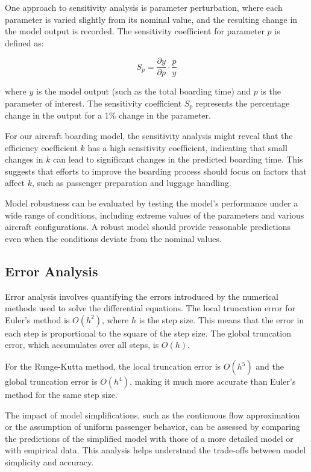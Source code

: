 One approach to sensitivity analysis is parameter perturbation, where each parameter is varied slightly from its nominal value, and the resulting change in the model output is recorded. The sensitivity coefficient for parameter $p$ is defined as:

\begin{equation}
S_p = \frac{\partial y}{\partial p} \cdot \frac{p}{y}
\label{eq:sensitivity}
\end{equation}

where $y$ is the model output (such as the total boarding time) and $p$ is the parameter of interest. The sensitivity coefficient $S_p$ represents the percentage change in the output for a 1\% change in the parameter.

For our aircraft boarding model, the sensitivity analysis might reveal that the efficiency coefficient $k$ has a high sensitivity coefficient, indicating that small changes in $k$ can lead to significant changes in the predicted boarding time. This suggests that efforts to improve the boarding process should focus on factors that affect $k$, such as passenger preparation and luggage handling.

Model robustness can be evaluated by testing the model's performance under a wide range of conditions, including extreme values of the parameters and various aircraft configurations. A robust model should provide reasonable predictions even when the conditions deviate from the nominal values.

\subsection{Error Analysis}

Error analysis involves quantifying the errors introduced by the numerical methods used to solve the differential equations. The local truncation error for Euler's method is $O(h^2)$, where $h$ is the step size. This means that the error in each step is proportional to the square of the step size. The global truncation error, which accumulates over all steps, is $O(h)$.

For the Runge-Kutta method, the local truncation error is $O(h^5)$ and the global truncation error is $O(h^4)$, making it much more accurate than Euler's method for the same step size.

The impact of model simplifications, such as the continuous flow approximation or the assumption of uniform passenger behavior, can be assessed by comparing the predictions of the simplified model with those of a more detailed model or with empirical data. This analysis helps understand the trade-offs between model simplicity and accuracy.

